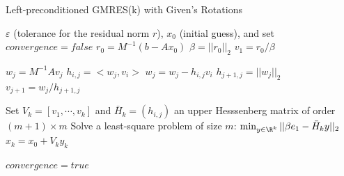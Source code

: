 



\begin{algorithm}                      %
\caption{Left-preconditioned GMRES(k) with Given's Rotations}          %
\label{alg:gmres}                           %
\begin{algorithmic}[1]                    %
    \State $\varepsilon$ (tolerance for the residual norm $r$), $x_0$ (initial guess), and set $convergence = false$
    \State $r_0 = M^{-1} (b-Ax_0)$ \label{alg:gmres_precond}
    \State $\beta = ||r_0||_2$			
    \State $v_1 = r_0 / \beta$ 

			\State $w_j = M^{-1} A v_j$  \label{alg:gmres_precond2} 
				\State $h_{i,j} = <w_j, v_i>$ 
				\State $w_j = w_j - h_{i,j} v_i$
			\EndFor %
			\State $h_{j+1, j}  = ||w_j||_2$		
			\State $v_{j+1} = w_j / h_{j+1,j}$		
	\EndFor %

			\State Set $V_k = [v_1, \cdots, v_k]$ and $\bar{H}_k = (h_{i,j})$ an upper Hesssenberg matrix of order $(m+1)\times m$
			\State Solve a least-square problem of size $m$: $\min_{y \in \R^k} ||\beta e_1 - \bar{H}_k y||_2$ %
			\State $x_k = x_0 + V_k y_k$ %

		\State $convergence = true$
	\EndIf
    \EndWhile
\end{algorithmic}
\end{algorithm}

